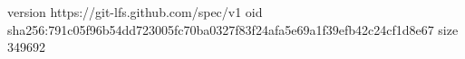 version https://git-lfs.github.com/spec/v1
oid sha256:791c05f96b54dd723005fc70ba0327f83f24afa5e69a1f39efb42c24cf1d8e67
size 349692
